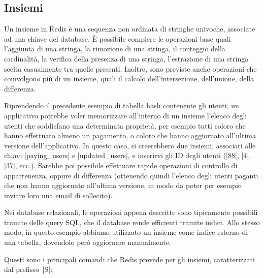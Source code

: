 \subsection{Insiemi}
\label{sec:redis:sets}

Un insieme in Redis è una sequenza non ordinata di stringhe univoche, associate ad una chiave del
database. È possibile compiere le operazioni base quali l'aggiunta di una stringa, la rimozione di
una stringa, il conteggio della cardinalità, la verifica della presenza di una stringa, l'estrazione
di una stringa scelta casualmente tra quelle presenti. Inoltre, sono previste anche operazioni che
coinvolgono più di un insieme, quali il calcolo dell'intersezione, dell'unione, della differenza.

Riprendendo il precedente esempio di tabella hash contenente gli utenti, un applicativo potrebbe
voler memorizzare all'interno di un insieme l'elenco degli utenti che soddisfano una determinata
proprietà, per esempio tutti coloro che hanno effettuato almeno un pagamento, o coloro che hanno
aggiornato all'ultima versione dell'applicativo. In questo caso, si creerebbero due
insiemi, associati alle chiavi \cverb|paying_users| e \cverb|updated_users|, e inserirvi gli ID degli
utenti (\cverb|88|, \cverb|4|, \cverb|37|, ecc.). Sarebbe poi possibile effettuare rapide operazioni di
controllo di appartenenza, oppure di differenza (ottenendo quindi l'elenco degli utenti paganti che
non hanno aggiornato all'ultima versione, in modo da poter per esempio inviare loro una email di
sollecito).

Nei database relazionali, le operazioni appena descritte sono tipicamente possibili tramite delle
query SQL, che il database rende efficienti tramite indici. Allo stesso modo, in questo esempio
abbiamo utilizzato un insieme come indice esterno di una tabella, dovendolo però aggiornare
manualmente.

Questi sono i principali comandi che Redis prevede per gli insiemi, caratterizzati dal
prefisso~\cverb|S|:

